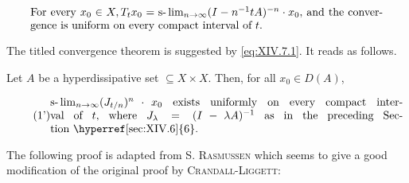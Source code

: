 \begin{equation}
\label{eq:XIV.7.1}
\begin{minipage}{0.92\linewidth}
\everymath{}\let\limits\nolimits
For every $x_0 \in X,  T_t x_0 = \slim\limits_{n \to \infty} (I - n^{-1} t A)^{-n} \cdot x_0,$ and the convergence is uniform on every compact interval of $t.$
\end{minipage}
\end{equation}

The titled convergence theorem is suggested by \eqref{eq:XIV.7.1}. It reads as follows. 

\begin{theorem}\label{thm:XIV.7.Theorem.1} Let $A$ be a hyperdissipative set $\subseteq X \times X$. Then, for all $x_0 \in D(A)$, 

\begin{equation}
\tag{1'}\label{eq:XIV.7.1'}
\begin{minipage}{0.92\linewidth}
\everymath{}\let\limits\nolimits
$\slim\limits_{n\to \infty}(J_{t/n})^n \cdot x_0$ exists uniformly on every compact interval of $t,$ where $J_{\lambda} = (I - \lambda A)^{-1}$ as in the preceding Section~\hyperref[sec:XIV.6]{6}.
\end{minipage}
\end{equation}
\end{theorem}

The following proof is adapted from S. \textsc{Rasmussen} \cite{rasmussen269} which seems to give a good modification of the original proof by \textsc{Crandall}-\textsc{Liggett}: 

